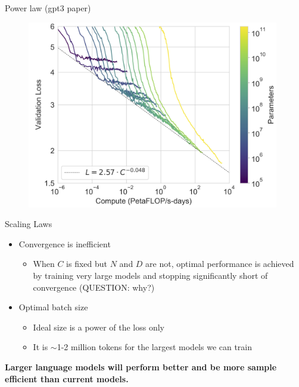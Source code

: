 \begin{vbframe}{Power law (gpt3 paper)}

\vfill

\begin{figure}
	\centering
	\includegraphics[width = 11cm]{./figure/losscompute}
\end{figure}

\vfill

\end{vbframe}



\begin{vbframe}{Scaling Laws}

\vfill

\begin{itemize}

	\item Convergence is inefficient
	\begin{itemize}
	\item When $C$ is fixed but $N$ and $D$ are not,
	optimal performance is achieved by training very
	large models and stopping significantly short of
	convergence (QUESTION: why?)  
	\end{itemize}

	\item Optimal batch size \qmark
	\begin{itemize}
	\item Ideal size is a power of the loss only
	\item It is $\sim$1-2 million tokens for the largest models we can train
	\end{itemize}

\end{itemize}

\vskip3mm

\textbf{Larger language models will perform better and be more sample efficient than current models.} 

\vfill

\end{vbframe}


